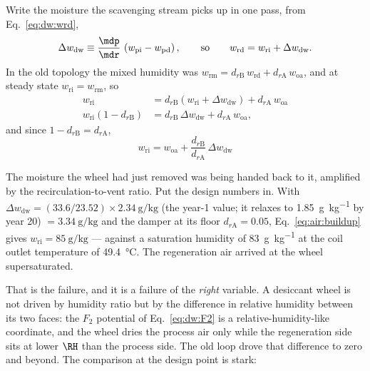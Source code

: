 Write the moisture the scavenging stream picks up in one pass, from
Eq.~\eqref{eq:dw:wrd},
\begin{equation}
\Delta w_{\mathrm{dw}} \equiv \frac{\mdp}{\mdr}\,
\left(w_{\mathrm{pi}}-w_{\mathrm{pd}}\right),
\qquad\text{so}\qquad
w_{\mathrm{rd}} = w_{\mathrm{ri}} + \Delta w_{\mathrm{dw}} .
\label{eq:air:dwdw}
\end{equation}
In the old topology the mixed humidity was
$w_{\mathrm{rm}} = d_{r\mathrm{B}}\,w_{\mathrm{rd}} + d_{r\mathrm{A}}\,
w_{\mathrm{oa}}$, and at steady state $w_{\mathrm{ri}}=w_{\mathrm{rm}}$, so
\begin{align*}
w_{\mathrm{ri}}
 &= d_{r\mathrm{B}}\left(w_{\mathrm{ri}}+\Delta w_{\mathrm{dw}}\right)
   + d_{r\mathrm{A}}\,w_{\mathrm{oa}}\\
w_{\mathrm{ri}}\left(1-d_{r\mathrm{B}}\right)
 &= d_{r\mathrm{B}}\,\Delta w_{\mathrm{dw}} + d_{r\mathrm{A}}\,w_{\mathrm{oa}},
\end{align*}
and since $1-d_{r\mathrm{B}}=d_{r\mathrm{A}}$,
\begin{equation}
\boxed{\;
w_{\mathrm{ri}} = w_{\mathrm{oa}}
+ \frac{d_{r\mathrm{B}}}{d_{r\mathrm{A}}}\,\Delta w_{\mathrm{dw}}
\;}
\label{eq:air:buildup}
\end{equation}

The moisture the wheel had just removed was being handed back to it, amplified
by the recirculation-to-vent ratio. Put the design numbers in. With
$\Delta w_{\mathrm{dw}} = (33.6/23.52)\times\SI{2.34}{\gram\per\kilogram}$ (the
year-1 value; it relaxes to \SI{1.85}{\gram\per\kilogram} by year 20)
$
= \SI{3.34}{\gram\per\kilogram}$ and the damper at its floor
$d_{r\mathrm{A}}=0.05$, Eq.~\eqref{eq:air:buildup} gives
$w_{\mathrm{ri}}=\SI{85}{\gram\per\kilogram}$ --- against a saturation humidity
of \SI{83}{\gram\per\kilogram} at the coil outlet temperature of
\SI{49.4}{\celsius}. The regeneration air arrived at the wheel supersaturated.

That is the failure, and it is a failure of the \emph{right} variable. A
desiccant wheel is not driven by humidity ratio but by the difference in
relative humidity between its two faces: the $F_2$ potential of
Eq.~\eqref{eq:dw:F2} is a relative-humidity-like coordinate, and the wheel
dries the process air only while the regeneration side sits at lower $\RH$
than the process side. The old loop drove that difference to zero and beyond.
The comparison at the design point is stark:

